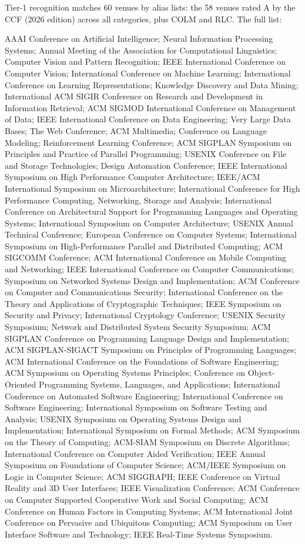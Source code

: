 \documentclass{article} %
\begin{document}
Tier-1 recognition matches 60 venues by alias lists: the 58 venues rated A by the
CCF (2026 edition) across all categories, plus COLM and RLC. The full list:

{\small AAAI Conference on Artificial Intelligence; Neural Information Processing Systems; Annual Meeting of the Association for Computational Linguistics; Computer Vision and Pattern Recognition; IEEE International Conference on Computer Vision; International Conference on Machine Learning; International Conference on Learning Representations; Knowledge Discovery and Data Mining; International ACM SIGIR Conference on Research and Development in Information Retrieval; ACM SIGMOD International Conference on Management of Data; IEEE International Conference on Data Engineering; Very Large Data Bases; The Web Conference; ACM Multimedia; Conference on Language Modeling; Reinforcement Learning Conference; ACM SIGPLAN Symposium on Principles and Practice of Parallel Programming; USENIX Conference on File and Storage Technologies; Design Automation Conference; IEEE International Symposium on High Performance Computer Architecture; IEEE/ACM International Symposium on Microarchitecture; International Conference for High Performance Computing, Networking, Storage and Analysis; International Conference on Architectural Support for Programming Languages and Operating Systems; International Symposium on Computer Architecture; USENIX Annual Technical Conference; European Conference on Computer Systems; International Symposium on High-Performance Parallel and Distributed Computing; ACM SIGCOMM Conference; ACM International Conference on Mobile Computing and Networking; IEEE International Conference on Computer Communications; Symposium on Networked Systems Design and Implementation; ACM Conference on Computer and Communications Security; International Conference on the Theory and Applications of Cryptographic Techniques; IEEE Symposium on Security and Privacy; International Cryptology Conference; USENIX Security Symposium; Network and Distributed System Security Symposium; ACM SIGPLAN Conference on Programming Language Design and Implementation; ACM SIGPLAN-SIGACT Symposium on Principles of Programming Languages; ACM International Conference on the Foundations of Software Engineering; ACM Symposium on Operating Systems Principles; Conference on Object-Oriented Programming Systems, Languages, and Applications; International Conference on Automated Software Engineering; International Conference on Software Engineering; International Symposium on Software Testing and Analysis; USENIX Symposium on Operating Systems Design and Implementation; International Symposium on Formal Methods; ACM Symposium on the Theory of Computing; ACM-SIAM Symposium on Discrete Algorithms; International Conference on Computer Aided Verification; IEEE Annual Symposium on Foundations of Computer Science; ACM/IEEE Symposium on Logic in Computer Science; ACM SIGGRAPH; IEEE Conference on Virtual Reality and 3D User Interfaces; IEEE Visualization Conference; ACM Conference on Computer Supported Cooperative Work and Social Computing; ACM Conference on Human Factors in Computing Systems; ACM International Joint Conference on Pervasive and Ubiquitous Computing; ACM Symposium on User Interface Software and Technology; IEEE Real-Time Systems Symposium.}
\end{document}
